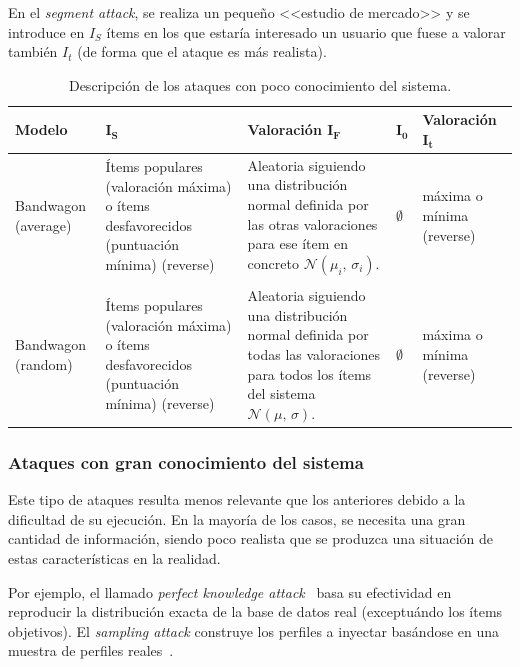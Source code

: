 En el \textit{segment attack}, se realiza un pequeño <<estudio de mercado>> y se introduce en $I_S$ ítems en los que estaría interesado un usuario que fuese a valorar también $I_t$ (de forma que el ataque es más realista).

\begin{table}
\small
\begin{centering}
	
		\begin{tabular}{@{}p{5em} p{8em} p{8em} p{2em} p{7em}@{}}
			\toprule
			\textbf{Modelo} & $\mathbf{I_S}$ & \textbf{Valoración} $\mathbf{I_F}$ & \hfil $\mathbf{I_0}$ & \textbf{Valoración} $\mathbf{I_t}$\\ 
			\midrule
			
			Bandwagon (average) & Ítems populares (valoración máxima) o ítems desfavorecidos (puntuación mínima) (reverse) & Aleatoria siguiendo una distribución normal definida por las otras valoraciones para ese ítem en concreto $\mathcal{N}(\mu_i,\,\sigma_i)$. & \hfil $\emptyset$ & máxima o mínima (reverse) \\\\
			
			Bandwagon (random) & Ítems populares (valoración máxima) o ítems desfavorecidos (puntuación mínima) (reverse) & Aleatoria siguiendo una distribución normal definida por todas las valoraciones para todos los ítems del sistema $\mathcal{N}(\mu,\,\sigma)$. & \hfil $\emptyset$ & máxima o mínima (reverse) \\
			\bottomrule
		\end{tabular}

\end{centering}
\caption[Sistemas de recomendación: ataques con poco conocimiento]{Descripción de los ataques con poco conocimiento del sistema.}
\label{tabla_descripcion_ataques_poco_con}
\end{table}


\subsubsection{Ataques con gran conocimiento del sistema}

Este tipo de ataques resulta menos relevante que los anteriores debido a la dificultad de su ejecución. En la mayoría de los casos, se necesita una gran cantidad de información, siendo poco realista que se produzca una situación de estas características en la realidad.

Por ejemplo, el llamado \textit{perfect knowledge attack}~\cite{Mobasher2006Thesis} basa su efectividad en reproducir la distribución exacta de la base de datos real (exceptuándo los ítems objetivos). El \textit{sampling attack} construye los perfiles a inyectar basándose en una muestra de perfiles reales~\cite{mingdan2018ShillingAttacksAReview}.

